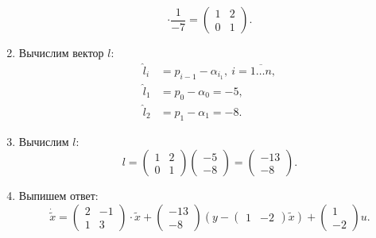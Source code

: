 \documentclass[../../TAU.tex]{subfiles}
\begin{document}
\begin{enumerate}
$$                \cdot
                \frac{1}{-7}=
                \begin{pmatrix}
                    1 & 2\\
                    0 & 1
                \end{pmatrix}.
            $$
        \item Вычислим вектор $l$:
            \begin{align*}
                \widehat l_i &= p_{i-1} - \alpha_{i_1},\ i=\overline{1\dots n}, \\
                \widehat l_1 &= p_{0} - \alpha_{0} = -5,                        \\
                \widehat l_2 &= p_{1} - \alpha_{1} = -8.
            \end{align*}
        \item Вычислим $l$:
        $$
            l =
            \begin{pmatrix}
                1 & 2\\
                0 & 1
            \end{pmatrix}
            \begin{pmatrix}
                -5 \\
                -8
            \end{pmatrix}
            =
            \begin{pmatrix}
                -13 \\
                -8
            \end{pmatrix}.
        $$
        \item Выпишем ответ:
        $$
            \dot{\widetilde x} =
            \begin{pmatrix}
                2 & -1 \\
                1 & 3
            \end{pmatrix}
            \cdot \widetilde x
            +
            \begin{pmatrix}
                -13 \\
                -8
            \end{pmatrix}
            \left(y-\begin{pmatrix}1 & -2\end{pmatrix}\widetilde x\right)
            +
            \begin{pmatrix}
                1 \\ -2
            \end{pmatrix}
            u.
        $$
    \end{enumerate}
\end{document}
